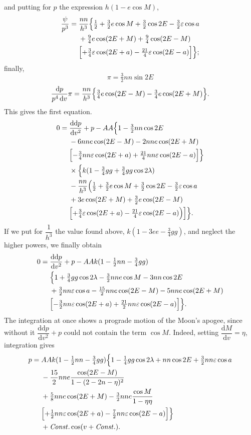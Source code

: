\noindent and putting for \(p\) the expression \(h(1-e\cos M)\),
\[
\begin{aligned}
\frac{\psi}{p^3}={}&\frac{nn}{h^3}\Bigl\{\tfrac12+\tfrac32e\cos M+\tfrac32\cos2E
-\tfrac32\varepsilon\cos a\\
&+\tfrac94e\cos(2E+M)+\tfrac94\cos(2E-M)\\
&\Bigl[+\tfrac34\varepsilon\cos(2E+a)-\tfrac{21}{4}\varepsilon\cos(2E-a)\Bigr]\Bigr\};
\end{aligned}
\]
\noindent finally,
\[
\pi=\tfrac32nn\sin2E
\]
\[
\frac{\mathrm{d}p}{p^4\,\mathrm{d}v}\pi
=\frac{nn}{h^3}\Bigl\{\tfrac34e\cos(2E-M)-\tfrac34e\cos(2E+M)\Bigr\}.
\]
\noindent This gives the first equation.
\[
\begin{aligned}
0={}&\frac{\mathrm{dd}p}{\mathrm{d}v^2}+p-AA\Bigl\{1-\tfrac32nn\cos2E\\
&-6nne\cos(2E-M)-2nne\cos(2E+M)\\
&\Bigl[-\tfrac34nn\varepsilon\cos(2E+a)+\tfrac{21}{4}nn\varepsilon\cos(2E-a)\Bigr]\Bigr\}\\
&\times\Bigl\{k(1-\tfrac34gg+\tfrac34gg\cos2\lambda)\\
&-\frac{nn}{h^3}\Bigl(\tfrac12+\tfrac32e\cos M+\tfrac32\cos2E
-\tfrac32\varepsilon\cos a\\
&+3e\cos(2E+M)+\tfrac32e\cos(2E-M)\\
&\Bigl[+\tfrac34\varepsilon\cos(2E+a)-\tfrac{21}{4}\varepsilon\cos(2E-a)\Bigr)\Bigr]\Bigr\}.
\end{aligned}
\]
\noindent If we put for \(\dfrac1{h^3}\) the value found above,
\(k(1-3ee-\tfrac34gg)\), and neglect the higher powers, we finally obtain
\[
\begin{aligned}
0={}&\frac{\mathrm{dd}p}{\mathrm{d}v^2}+p-AAk(1-\tfrac12nn-\tfrac34gg)\\
&\Bigl\{1+\tfrac34gg\cos2\lambda-\tfrac32nne\cos M-3nn\cos2E\\
&+\tfrac32nn\varepsilon\cos a-\tfrac{15}{2}nne\cos(2E-M)-5nne\cos(2E+M)\\
&\Bigl[-\tfrac32nn\varepsilon\cos(2E+a)+\tfrac{21}{2}nn\varepsilon\cos(2E-a)\Bigr]\Bigr\}.
\end{aligned}
\]
\noindent The integration at once shows a prograde motion of the
Moon’s apogee, since without it \(\dfrac{\mathrm{dd}p}{\mathrm{d}v^2}+p\)
could not contain the term \(\cos M\). Indeed, setting
\(\dfrac{\mathrm{d}M}{\mathrm{d}v}=\eta\), integration gives
\[
\begin{aligned}
p={}&AAk(1-\tfrac12nn-\tfrac34gg)\Bigl\{1-\tfrac14gg\cos2\lambda
+nn\cos2E+\tfrac32nn\varepsilon\cos a\\
&-\frac{15}{2}nne\frac{\cos(2E-M)}{1-(2-2n-\eta)^2}\\
&+\tfrac58nne\cos(2E+M)-\tfrac32nne\frac{\cos M}{1-\eta\eta}\\
&\Bigl[+\tfrac12nn\varepsilon\cos(2E+a)-\tfrac72nn\varepsilon\cos(2E-a)\Bigr]\Bigr\}\\
&+\mathit{Const.}\cos(v+\mathit{Const.}).
\end{aligned}
\]
\clearpage
\endgroup
